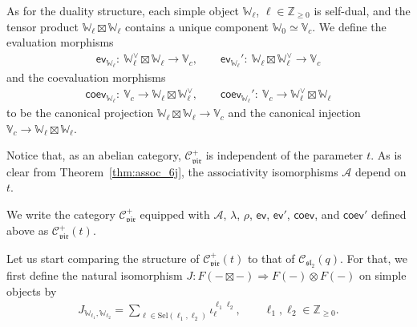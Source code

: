 \documentclass[10pt,a4paper]{amsart}
\numberwithin{equation}{section}
\newcommand{\bZ}{\mathbb{Z}}
\newcommand{\cA}{\mathcal{A}}
\newcommand{\cC}{\mathcal{C}}
\newcommand{\fsl}{\mathfrak{sl}}
\newcommand{\CGemb}[3]{\iota_{#1}^{#2 #3}}
\newcommand{\catQG}{\cC_{\fsl_{2}}}
\newcommand{\catVir}{\cC_{\vir}}
\newcommand{\Sel}{\mathrm{Sel}}
\newcommand{\virvoa}{\mathbb{V}}
\newcommand{\virmod}{\mathbb{W}}
\newcommand{\vir}{\mathfrak{vir}}
\newcommand{\ev}{\mathsf{ev}}
\newcommand{\coev}{\mathsf{coev}}
\begin{document}
As for the duality structure, each simple object $\virmod_{\ell}$, $\ell\in \bZ_{\geq 0}$ is self-dual, and the tensor product $\virmod_{\ell}\boxtimes\virmod_{\ell}$ contains a unique component $\virmod_{0}\simeq \virvoa_{c}$.
We define the evaluation morphisms
\begin{align*}
	\ev_{\virmod_{\ell}}\colon\ \virmod_{\ell}^{\vee}\boxtimes \virmod_{\ell} \to \virvoa_{c},\qquad
	\ev_{\virmod_{\ell}}'\colon\ \virmod_{\ell}\boxtimes \virmod_{\ell}^{\vee} \to \virvoa_{c}
\end{align*}
and the coevaluation morphisms
\begin{align*}
	\coev_{\virmod_{\ell}}\colon\ \virvoa_{c} \to \virmod_{\ell}\boxtimes \virmod_{\ell}^{\vee},\qquad
	\coev_{\virmod_{\ell}}'\colon\ \virvoa_{c} \to \virmod_{\ell}^{\vee}\boxtimes \virmod_{\ell}
\end{align*}to be the canonical projection
$\virmod_{\ell}\boxtimes\virmod_{\ell} \to \virvoa_{c}$ and the canonical injection
$\virvoa_{c} \to \virmod_{\ell}\boxtimes\virmod_{\ell}$.

Notice that, as an abelian category, $\catVir^{+}$ is independent of the parameter $t$.
As is clear from Theorem~\ref{thm:assoc_6j}, the associativity isomorphisms $\cA$ depend on $t$.

\begin{defn}
We write the category $\catVir^{+}$ equipped with $\cA$, $\lambda$, $\rho$,
$\ev$, $\ev'$, $\coev$, and $\coev'$ defined above as $\catVir^{+}(t)$.
\end{defn}

Let us start comparing the structure of $\catVir^{+}(t)$ to that of $\catQG(q)$.
For that, we first define the natural isomorphism
$
	J \colon F(- \boxtimes -) \Rightarrow F(-)\otimes F(-)
$
on simple objects by
\begin{gather*}
	J_{\virmod_{\ell_{1}},\virmod_{\ell_{2}}} = \sum_{\ell\in \Sel (\ell_{1},\ell_{2})}\CGemb{\ell}{\ell_{1}}{\ell_{2}},\qquad \ell_{1},\ell_{2}\in \bZ_{\geq 0}.
\end{gather*}
\end{document}
